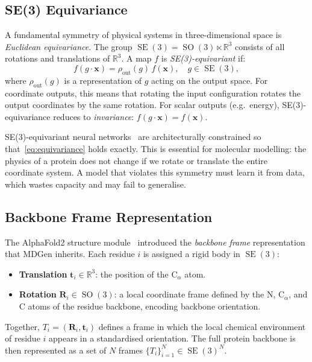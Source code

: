 \documentclass[11pt,a4paper]{article}
\DeclareMathOperator{\SE}{SE}
\DeclareMathOperator{\SO}{SO}
\newcommand{\bx}{\mathbf{x}}
\newcommand{\bR}{\mathbf{R}}
\newcommand{\bt}{\mathbf{t}}
\newcommand{\RR}{\mathbb{R}}
\begin{document}
\subsection{SE(3) Equivariance}

A fundamental symmetry of physical systems in three-dimensional space is \emph{Euclidean
equivariance}.  The group $\SE(3) = \SO(3) \ltimes \RR^3$ consists of all rotations and
translations of $\RR^3$.  A map $f$ is \emph{SE(3)-equivariant} if:
\begin{equation}
  f(g \cdot \bx) = \rho_{\text{out}}(g)\,f(\bx), \quad g \in \SE(3),
  \label{eq:equivariance}
\end{equation}
where $\rho_{\text{out}}(g)$ is a representation of $g$ acting on the output space.  For
coordinate outputs, this means that rotating the input configuration rotates the output coordinates
by the same rotation.  For scalar outputs (e.g.\ energy), SE(3)-equivariance reduces to
\emph{invariance}: $f(g \cdot \bx) = f(\bx)$.

SE(3)-equivariant neural networks~\cite{fuchs2020,satorras2021} are architecturally constrained so
that~\eqref{eq:equivariance} holds exactly.  This is essential for molecular modelling: the physics
of a protein does not change if we rotate or translate the entire coordinate system.  A model that
violates this symmetry must learn it from data, which wastes capacity and may fail to generalise.

\subsection{Backbone Frame Representation}

The AlphaFold2 structure module~\cite{jumper2021} introduced the \emph{backbone frame}
representation that MDGen inherits.  Each residue $i$ is assigned a rigid body in $\SE(3)$:
\begin{itemize}[leftmargin=2em]
  \item \textbf{Translation} $\bt_i \in \RR^3$: the position of the $\text{C}_\alpha$ atom.
  \item \textbf{Rotation} $\bR_i \in \SO(3)$: a local coordinate frame defined by the N,
    $\text{C}_\alpha$, and C atoms of the residue backbone, encoding backbone orientation.
\end{itemize}
Together, $T_i = (\bR_i, \bt_i)$ defines a frame in which the local chemical environment of
residue $i$ appears in a standardised orientation.  The full protein backbone is then represented
as a set of $N$ frames $\{T_i\}_{i=1}^N \in \SE(3)^N$.
\end{document}
